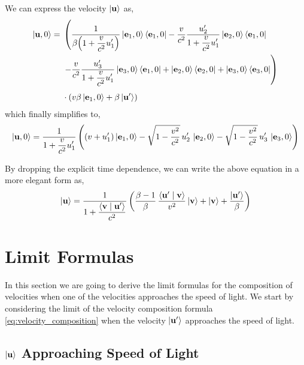 \documentclass[12pt]{article}
\newcommand{\ip}[2]{\langle #1 \mid #2 \rangle}
\begin{document}
We can express the velocity $\ket{\vb{u}}$ as,
\begin{equation}
  \begin{aligned}
    \ket{\vb{u},0} =\;
    &\left(
      \frac{1}{\displaystyle\beta\!\left(1 + \frac{v}{c^2}u'_1\right)}
        \ket{\vb{e}_1,0}\bra{\vb{e}_1,0}
      - \frac{v}{c^2}\frac{u'_2}{\displaystyle 1 + \frac{v}{c^2}u'_1}
        \ket{\vb{e}_2,0}\bra{\vb{e}_1,0} \right.\\
    &\left.
      - \frac{v}{c^2}\frac{u'_3}{\displaystyle 1 + \frac{v}{c^2}u'_1}
        \ket{\vb{e}_3,0}\bra{\vb{e}_1,0}
      + \ket{\vb{e}_2,0}\bra{\vb{e}_2,0}
      + \ket{\vb{e}_3,0}\bra{\vb{e}_3,0}
    \right) \\[0.4em]
    &\cdot\left(v\beta\ket{\vb{e}_1,0} + \beta\ket{\vb{u}'}\right)
  \end{aligned}
\end{equation}
which finally simplifies to,
\begin{equation}
  \ket{\vb{u},0} = \frac{1}{\displaystyle 1 + \frac{v}{c^2}u'_1}
  \left(
    (v + u'_1)\ket{\vb{e}_1,0}
    - \sqrt{1 - \frac{v^2}{c^2}}\,u'_2\,\ket{\vb{e}_2,0}
    - \sqrt{1 - \frac{v^2}{c^2}}\,u'_3\,\ket{\vb{e}_3,0}
  \right)
\end{equation}

By dropping the explicit time dependence, we can write the above equation in a more elegant
form as,
\begin{equation}
  \ket{\vb{u}} =
  \frac{1}{\displaystyle 1 + \frac{\ip{\vb{v}}{\vb{u}'}}{c^2}}
  \left(
    \frac{\beta - 1}{\beta}\,\frac{\ip{\vb{u}'}{\vb{v}}}{v^2}\ket{\vb{v}}
    + \ket{\vb{v}}
    + \frac{\ket{\vb{u}'}}{\beta}
  \right)
  \label{eq:velocity_composition}
\end{equation}

\section{Limit Formulas}

In this section we are going to derive the limit formulas for the composition of velocities
when one of the velocities approaches the speed of light. We start by considering the limit
of the velocity composition formula \eqref{eq:velocity_composition} when the velocity
$\ket{\vb{u}'}$ approaches the speed of light.

\subsection{$\ket{\vb{u}}$ Approaching Speed of Light}
\end{document}
